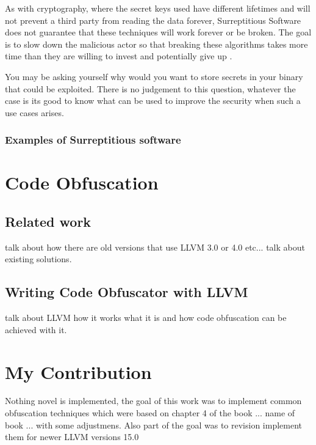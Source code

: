 As with cryptography, where the secret keys used have different lifetimes and will not prevent a third party from reading the data forever,
Surreptitious Software does not guarantee that these techniques will work forever or be broken. 
The goal is to slow down the malicious actor so that breaking these algorithms takes more time than they are willing to invest and potentially give up \cite{serr-soft-2}.

You may be asking yourself why would you want to store secrets in your binary that could be exploited. There is no
judgement to this question, whatever the case is its good to know what can be used to improve the security when such
a use cases arises.

\subsubsection{Examples of Surreptitious software}

\section{Code Obfuscation}
\subsection{Related work}
talk about how there are old versions that use LLVM 3.0 or 4.0 etc...
talk about existing solutions.
\subsection{Writing Code Obfuscator with LLVM}
talk about LLVM how it works what it is and how code obfuscation can be achieved with it.




\section{My Contribution}

Nothing novel is implemented, the goal of this work was to implement common obfuscation techniques which were
based on chapter 4 of the book ... name of book ... with some adjustmens. Also part of the goal was to
revision implement them for newer LLVM versions 15.0

